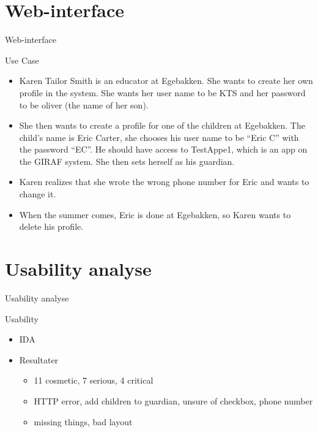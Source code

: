 \section{Web-interface}
\begin{frame}{Web-interface}
\pause
		\begin{block}{Use Case}
				\begin{itemize}
					\item Karen Tailor Smith is an educator at Egebakken. She wants to create her own profile in the system. She wants her user name to be KTS and her password to be oliver (the name of her son).
					\item She then wants to create a profile for one of the children at Egebakken. The child's name is Eric Carter, she chooses his user name to be ``Eric C'' with the password ``EC''. He should have access to TestAppe1, which is an app on the GIRAF system. She then sets herself as his guardian.
					\item Karen realizes that she wrote the wrong phone number for Eric and wants to change it.
					\item When the summer comes, Eric is done at Egebakken, so Karen wants to delete his profile.
				\end{itemize}
		\end{block}
\end{frame}

\section{Usability analyse}
\begin{frame}{Usability analyse}
\pause
		\begin{block}{Usability}
			\begin{itemize}
				\pause
				\item IDA
				\pause
				\item Resultater
				\begin{itemize}
				\pause
					\item 11 cosmetic, 7 serious, 4 critical
					\pause
					\item HTTP error, add children to guardian, unsure of checkbox, phone number
					\pause
					\item missing things, bad layout
				\end{itemize}
			\end{itemize}
		\end{block}
\end{frame}